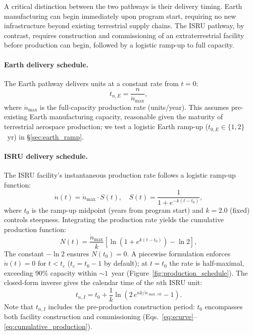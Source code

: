 \documentclass[preprint,12pt]{elsarticle}
\begin{document}
A critical distinction between the two pathways is their delivery timing. Earth manufacturing can begin immediately upon program start, requiring no new infrastructure beyond existing terrestrial supply chains. The ISRU pathway, by contrast, requires construction and commissioning of an extraterrestrial facility before production can begin, followed by a logistic ramp-up to full capacity.

\paragraph{Earth delivery schedule.} The Earth pathway delivers units at a constant rate from $t = 0$:
\begin{equation}
  t_{n,E} = \frac{n}{\dot{n}_{\max}},
  \label{eq:earth_schedule}
\end{equation}
where $\dot{n}_{\max}$ is the full-capacity production rate (units/year). This assumes pre-existing Earth manufacturing capacity, reasonable given the maturity of terrestrial aerospace production; we test a logistic Earth ramp-up ($t_{0,E} \in \{1, 2\}$~yr) in \S\ref{sec:earth_ramp}.

\paragraph{ISRU delivery schedule.} The ISRU facility's instantaneous production rate follows a logistic ramp-up function:
\begin{equation}
  \dot{n}(t) = \dot{n}_{\max} \cdot S(t), \quad S(t) = \frac{1}{1 + e^{-k(t - t_0)}},
  \label{eq:scurve}
\end{equation}
where $t_0$ is the ramp-up midpoint (years from program start) and $k = 2.0$ (fixed) controls steepness. Integrating the production rate yields the cumulative production function:
\begin{equation}
  N(t) = \frac{\dot{n}_{\max}}{k} \left[ \ln\!\left(1 + e^{k(t - t_0)}\right) - \ln 2 \right],
  \label{eq:cumulative_production}
\end{equation}
The constant $-\ln 2$ ensures $N(t_0) = 0$. A piecewise formulation enforces $\dot{n}(t) = 0$ for $t < t_c$ ($t_c = t_0 - 1$ by default); at $t = t_0$ the rate is half-maximal, exceeding 90\% capacity within ${\sim}1$~year (Figure~\ref{fig:production_schedule}). The closed-form inverse gives the calendar time of the $n$th ISRU unit:
\begin{equation}
  t_{n,I} = t_0 + \frac{1}{k} \ln\!\left(2\,e^{nk/\dot{n}_{\max,\mathrm{eff}}} - 1\right).
  \label{eq:production_schedule}
\end{equation}
Note that $t_{n,I}$ includes the pre-production construction period: $t_0$ encompasses both facility construction and commissioning (Eqs.~\ref{eq:scurve}--\ref{eq:cumulative_production}).
\end{document}
